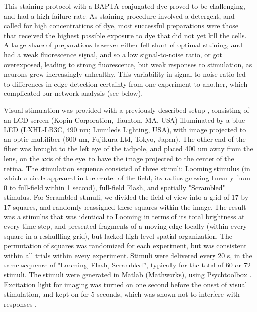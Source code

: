 \documentclass{article}
\begin{document}
This staining protocol with a BAPTA-conjugated dye proved to be challenging, and had a high failure rate. As staining procedure involved a detergent, and called for high concentrations of dye, most successful preparations were those that received the highest possible exposure to dye that did not yet kill the cells. A large share of preparations however either fell short of optimal staining, and had a weak fluorescence signal, and so a low signal-to-noise ratio, or got overexposed, leading to strong fluorescence, but weak responses to stimulation, as neurons grew increasingly unhealthy. This variability in signal-to-noise ratio led to  differences in edge detection certainty from one experiment to another, which complicated our network analysis (see below).

Visual stimulation was provided with a previously described setup \citep{khakhalin2014}, consisting of an LCD screen (Kopin Corporation, Taunton, MA, USA) illuminated by a blue LED (LXHL-LB3C, 490 nm; Lumileds Lighting, USA), with image projected to an optic multifiber (600 um, Fujikura Ltd, Tokyo, Japan). The other end of the fiber was brought to the left eye of the tadpole, and placed 400 um away from the lens, on the axis of the eye, to have the image projected to the center of the retina. The stimulation sequence consisted of three stimuli: Looming stimulus (in which a circle appeared in the center of the field, its radius growing linearly from 0 to full-field within 1 second), full-field Flash, and spatially "Scrambled" stimulus. For Scrambled stimuli, we divided the field of view into a grid of 17 by 17 squares, and randomly reassigned these squares within the image. The result was a stimulus that was identical to Looming in terms of its total brightness at every time step, and presented fragments of a moving edge locally (within every square in a reshuffling grid), but lacked high-level spatial organization. The permutation of squares was randomized for each experiment, but was consistent within all trials within every experiment. Stimuli were delivered every 20 s, in the same sequence of "Looming, Flash, Scrambled”, typically for the total of 60 or 72 stimuli. The stimuli were generated in Matlab (Mathworks), using Psychtoolbox \citep{kleiner2007psychtoolbox}. Excitation light for imaging was turned on one second before the onset of visual stimulation, and kept on for 5 seconds, which was shown not to interfere with responses \citep{xu2011}.
\end{document}
